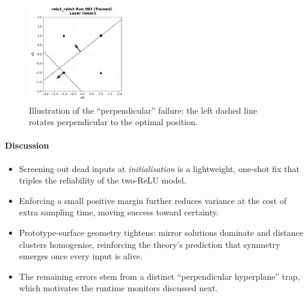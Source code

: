 \begin{figure}[h]
  \centering
  \includegraphics[width=0.38\textwidth]{relu1/figs/reinit_bad_example.pdf}
  \caption{Illustration of the ``perpendicular'' failure: the left dashed
           line rotates perpendicular to the optimal position.}
  \label{fig:reinit-bad}
\end{figure}

\paragraph{Discussion}
\begin{itemize}
  \item Screening out dead inputs at \emph{initialisation} is a
        lightweight, one-shot fix that triples the reliability of the
        two-ReLU model.
  \item Enforcing a small positive margin further reduces variance at the
        cost of extra sampling time, moving success toward certainty.
  \item Prototype-surface geometry tightens: mirror solutions dominate
        and distance clusters homogenise, reinforcing the theory's
        prediction that symmetry emerges once every input is alive.
  \item The remaining errors stem from a distinct ``perpendicular
        hyperplane'' trap, which motivates the runtime monitors discussed
        next.
\end{itemize}

\hrulefill
